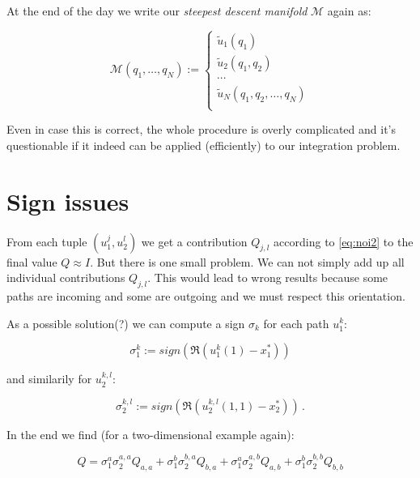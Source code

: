 \documentclass[a4paper,10pt]{article}
\begin{document}
At the end of the day we write our \emph{steepest descent manifold} $\mathcal{M}$ again as:

\begin{equation}
\mathcal{M}(q_1, \ldots, q_N) :=
 \begin{cases}
  \tilde{u}_1(q_1) \\
  \tilde{u}_2(q_1, q_2) \\
  \cdots \\
  \tilde{u}_N(q_1, q_2, \ldots, q_N) \\
 \end{cases}
\end{equation}

Even in case this is correct, the whole procedure is overly complicated and
it's questionable if it indeed can be applied (efficiently) to our integration problem.


\section{Sign issues}

From each tuple $\left(u_1^{j}, u_2^{l}\right)$ we get a contribution $Q_{j,l}$ according
to \eqref{eq:noi2} to the final value $Q \approx I$. But there is one small problem. We can
not simply add up all individual contributions $Q_{j,l}$. This would lead to wrong results
because some paths are incoming and some are outgoing and we must respect this orientation.

As a possible solution(?) we can compute a sign $\sigma_{k}$ for each path $u_1^k$:

\begin{equation}
 \sigma_1^k := sign( \Re(u_1^k(1) - x_1^{*}))
\end{equation}

and similarily for $u_2^{k,l}$:

\begin{equation}
 \sigma_2^{k,l} := sign( \Re(u_2^{k,l}(1,1) - x_2^{*})) \,.
\end{equation}

In the end we find (for a two-dimensional example again):

\begin{equation}
 Q = \sigma_1^a \sigma_2^{a,a} Q_{a,a} +
     \sigma_1^b \sigma_2^{b,a} Q_{b,a} +
     \sigma_1^a \sigma_2^{a,b} Q_{a,b} +
     \sigma_1^b \sigma_2^{b,b} Q_{b,b}
\end{equation}




\end{document}
